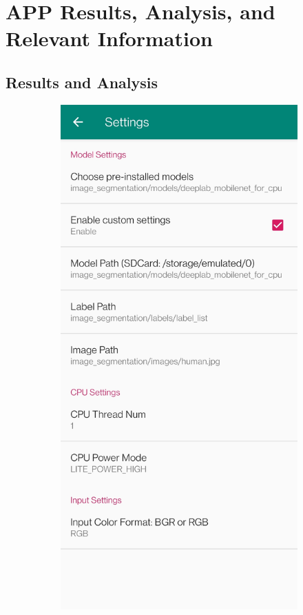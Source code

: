 \section{APP Results, Analysis, and Relevant Information}

\subsection{Results and Analysis}
\begin{figure}[htbp]
    \centering
    \begin{subfigure}[t]{0.4\linewidth}
        \includegraphics[width=1\textwidth]{figures/settings.jpg}

\end{subfigure}
\end{figure}
